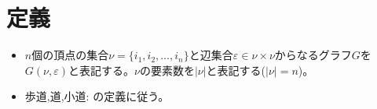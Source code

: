 \chapter{定義}
    \begin{itemize}
        \item $n$個の頂点の集合$\nu=\{i_1,i_2,\dotsc,i_n\}$と辺集合$\varepsilon\in\nu\times\nu$からなるグラフ$G$を$G(\nu,\varepsilon)$と表記する。$\nu$の要素数を$|\nu|$と表記する($|\nu|=n$)。
        \item 歩道,道,小道: \cite{離散数学}の定義に従う。
    \end{itemize}